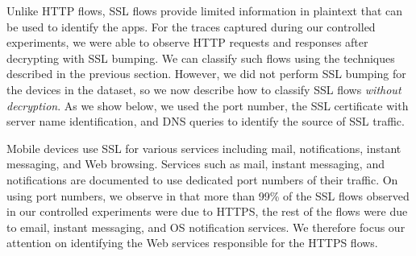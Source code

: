 Unlike HTTP flows, SSL flows provide limited information in plaintext that can be used to identify the apps. 
For the traces captured during our controlled experiments, we were able to observe HTTP requests and responses 
after decrypting with SSL bumping. We can classify such flows using the techniques described in the previous section. 
However, we did not perform SSL bumping for the devices in the \mobWild dataset, so we now describe how to 
classify SSL flows \emph{without decryption}. As we show below, we used the port number, the SSL certificate with server 
name identification, and DNS queries to identify the source of SSL traffic. 


Mobile devices use SSL for various services including mail, notifications, instant messaging, and Web browsing.
Services such as mail, instant messaging, and notifications are documented to use dedicated port numbers of their traffic.
On using port numbers, we observe in that more than 99\% of the SSL flows observed in our controlled experiments were due to HTTPS, the rest of the flows were due to email, instant messaging, and OS notification services. 
We therefore focus our attention on identifying the Web services responsible for the HTTPS flows. 

